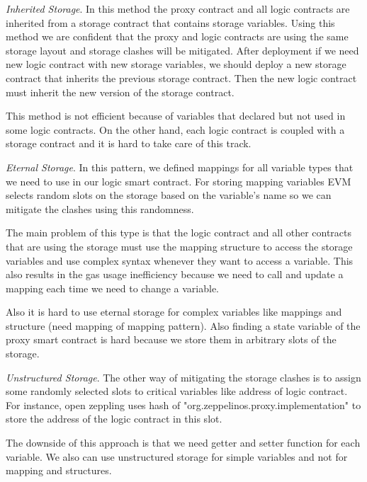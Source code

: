 \textit{Inherited Storage}. 
In this method the proxy contract and all logic contracts are inherited from a storage contract that contains storage variables. Using this method we are confident that the proxy and logic contracts are using the same storage layout and storage clashes will be mitigated.
After deployment if we need new logic contract with new storage variables, we should deploy a new storage contract that inherits the previous storage contract. Then the new logic contract must inherit the new version of the storage contract.

This method is not efficient because of variables that declared but not used in some logic contracts. On the other hand, each logic contract is coupled with a storage contract and it is hard to take care of this track. 

\textit{Eternal Storage}. 
In this pattern, we defined mappings for all variable types that we need to use in our logic smart contract. For storing mapping variables EVM selects random slots on the storage based on the variable's name so we can mitigate the clashes using this randomness.

The main problem of this type is that the logic contract and all other contracts that are using the storage must use the mapping structure to access the storage variables and use complex syntax whenever they want to access a variable. This also results in the gas usage inefficiency because we need to call and update a mapping each time we need to change a variable.  

Also it is hard to use eternal storage for complex variables like mappings and structure (need mapping of mapping pattern). Also finding a state variable of the proxy smart contract is hard because we store them in arbitrary slots of the storage.

\textit{Unstructured Storage}. 
The other way of mitigating the storage clashes is to assign some randomly selected slots to critical variables like address of logic contract. For instance, open zeppling uses hash of "org.zeppelinos.proxy.implementation" to store the address of the logic contract in this slot.

The downside of this approach is that we need getter and setter function for each variable. We also can use unstructured storage for simple variables and not for mapping and structures.



